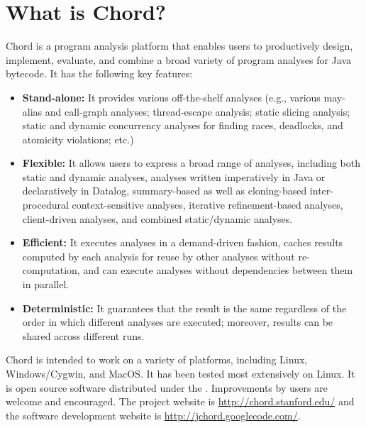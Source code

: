 \chapter{What is Chord?}
\label{chap:whatis-chord}

Chord is a program analysis platform that enables users to
productively design, implement, evaluate, and combine a
broad variety of program analyses for Java bytecode. It has the
following key features:

\begin{itemize}
\item

{\bf Stand-alone:} It provides various off-the-shelf analyses (e.g., various
may-alias and call-graph analyses; thread-escape analysis;
static slicing analysis; static and dynamic concurrency analyses for finding
races, deadlocks, and atomicity violations; etc.)

\item

{\bf Flexible:} It allows users to express a broad range of analyses,
including both static and dynamic analyses, analyses written
imperatively in Java or declaratively in Datalog, summary-based as
well as cloning-based inter-procedural context-sensitive analyses,
iterative refinement-based analyses, client-driven analyses, and
combined static/dynamic analyses.

\item

{\bf Efficient:} It executes analyses in a demand-driven fashion, caches
results computed by each analysis for reuse by other analyses without
re-computation, and can execute analyses without dependencies between
them in parallel.

\item

{\bf Deterministic:} It guarantees that the result is the same regardless of
the order in which different analyses are executed; moreover, results
can be shared across different runs.
\end{itemize}

Chord is intended to work on a variety of platforms,
including Linux, Windows/Cygwin, and MacOS.  It has been tested most
extensively on Linux.  It is open source software distributed under
the .
Improvements by users are welcome and encouraged.  The project website
is \url{http://chord.stanford.edu/} and the software development website is
\url{http://jchord.googlecode.com/}.


